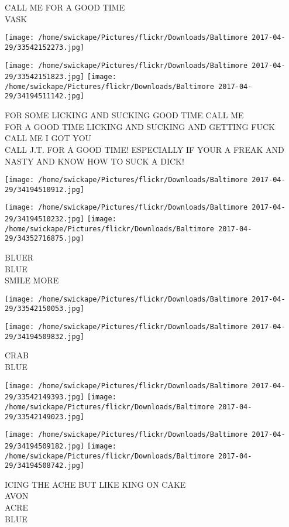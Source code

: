 \documentclass[10pt,letterpaper]{article}
\begin{document}
CALL ME FOR A GOOD TIME\\
VASK
\pagebreak

\texttt{[image: /home/swickape/Pictures/flickr/Downloads/Baltimore 2017-04-29/33542152273.jpg]}

\vspace{0.25in}
\texttt{[image: /home/swickape/Pictures/flickr/Downloads/Baltimore 2017-04-29/33542151823.jpg]}
\texttt{[image: /home/swickape/Pictures/flickr/Downloads/Baltimore 2017-04-29/34194511142.jpg]}

FOR SOME LICKING AND SUCKING GOOD TIME CALL ME\\
FOR A GOOD TIME LICKING AND SUCKING AND GETTING FUCK CALL ME I GOT YOU\\
CALL J.T. FOR A GOOD TIME!   ESPECIALLY IF YOUR A FREAK AND NASTY AND KNOW HOW TO SUCK A DICK!
\pagebreak

\texttt{[image: /home/swickape/Pictures/flickr/Downloads/Baltimore 2017-04-29/34194510912.jpg]}

\vspace{0.25in}
\texttt{[image: /home/swickape/Pictures/flickr/Downloads/Baltimore 2017-04-29/34194510232.jpg]}
\texttt{[image: /home/swickape/Pictures/flickr/Downloads/Baltimore 2017-04-29/34352716875.jpg]}

BLUER\\
BLUE\\
SMILE MORE
\pagebreak

\texttt{[image: /home/swickape/Pictures/flickr/Downloads/Baltimore 2017-04-29/33542150053.jpg]}

\vspace{0.25in}
\texttt{[image: /home/swickape/Pictures/flickr/Downloads/Baltimore 2017-04-29/34194509832.jpg]}

CRAB\\
BLUE
\pagebreak

\texttt{[image: /home/swickape/Pictures/flickr/Downloads/Baltimore 2017-04-29/33542149393.jpg]}
\texttt{[image: /home/swickape/Pictures/flickr/Downloads/Baltimore 2017-04-29/33542149023.jpg]}

\texttt{[image: /home/swickape/Pictures/flickr/Downloads/Baltimore 2017-04-29/34194509182.jpg]}
\texttt{[image: /home/swickape/Pictures/flickr/Downloads/Baltimore 2017-04-29/34194508742.jpg]}

ICING THE ACHE BUT LIKE KING ON CAKE\\
AVON\\
ACRE\\
BLUE
\pagebreak
\end{document}
